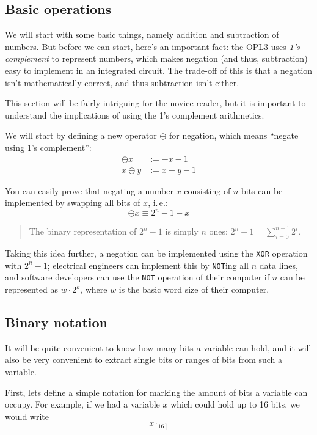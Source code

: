 \documentclass[english]{scrartcl}
\newcommand{\code}[1]{\texttt{#1}}
\newenvironment{details}{
\par\nobreak\noindent%
\begin{quotation}%
  \footnotesize%
  \noindent\Radioactivity%
}{
\end{quotation}
}
\newcommand{\bitlen}[2]
	{{#1}_{[#2]}}
\begin{document}
\subsection{Basic operations}
We will start with some basic things, namely addition and subtraction of numbers.
But before we can start, here's an important fact: the OPL3 uses \emph{1's complement} to represent numbers, which makes negation (and thus, subtraction) easy to implement in an integrated circuit.
The trade-off of this is that a negation isn't mathematically correct, and thus subtraction isn't either.

This section will be fairly intriguing for the novice reader, but it is important to understand the implications of using the 1's complement arithmetics.

We will start by defining a new operator $\ominus$ for negation, which means ``negate using 1's complement'':
\begin{align*}
	\ominus x  & :=-x-1  \\
	x\ominus y & :=x-y-1
\end{align*}

You can easily prove that negating a number $x$ consisting of $n$ bits can be implemented by swapping all bits of $x$, i.\,e.: \[ \ominus x \equiv 2^n - 1 - x \]

\begin{details}
The binary representation of $2^n-1$ is simply $n$ ones: $2^n-1 = \sum_{i=0}^{n-1} 2^i$.
\end{details}

Taking this idea further, a negation can be implemented using the \code{XOR} operation with $2^n-1$; electrical engineers can implement this by \code{NOT}ing all $n$ data lines, and software developers can use the \code{NOT} operation of their computer if $n$ can be represented as $w\cdot2^k$, where $w$ is the basic word size of their computer.


\subsection{Binary notation}
It will be quite convenient to know how many bits a variable can hold, and it will also be very convenient to extract single bits or ranges of bits from such a variable.

First, lets define a simple notation for marking the amount of bits a variable can occupy.
For example, if we had a variable $x$ which could hold up to 16 bits, we would write \[ \bitlen{x}{16} \]
\end{document}
